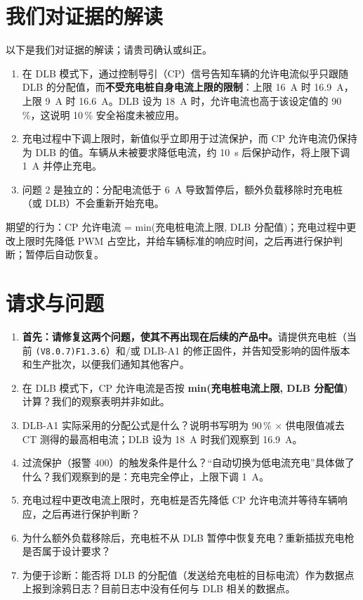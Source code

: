 \documentclass[11pt,a4paper]{article}
\begin{document}
\section{我们对证据的解读}

以下是我们对证据的解读；请贵司确认或纠正。

\begin{enumerate}
\item 在 DLB 模式下，通过控制导引（CP）信号告知车辆的允许电流似乎只跟随 DLB 的分配值，而\textbf{不受充电桩自身电流上限的限制}：上限 16~A 时 16.9~A，上限 9~A 时 16.6~A。DLB 设为 18~A 时，允许电流也高于该设定值的 90\,\%，这说明 10\,\% 安全裕度未被应用。
\item 充电过程中下调上限时，新值似乎立即用于过流保护，而 CP 允许电流仍保持为 DLB 的值。车辆从未被要求降低电流，约 10~s 后保护动作，将上限下调 1~A 并停止充电。
\item 问题 2 是独立的：分配电流低于 6~A 导致暂停后，额外负载移除时充电桩（或 DLB）不会重新开始充电。
\end{enumerate}

期望的行为：CP 允许电流 = min(充电桩电流上限, DLB 分配值)；充电过程中更改上限时先降低 PWM 占空比，并给车辆标准的响应时间，之后再进行保护判断；暂停后自动恢复。

\section{请求与问题}

\begin{enumerate}
\item \textbf{首先：请修复这两个问题，使其不再出现在后续的产品中。}请提供充电桩（当前 \texttt{(V8.0.7)F1.3.6}）和/或 DLB-A1 的修正固件，并告知受影响的固件版本和生产批次，以便我们通知其他客户。
\item 在 DLB 模式下，CP 允许电流是否按 \textbf{min(充电桩电流上限, DLB 分配值)} 计算？我们的观察表明并非如此。
\item DLB-A1 实际采用的分配公式是什么？说明书写明为 90\,\% × 供电限值减去 CT 测得的最高相电流；DLB 设为 18~A 时我们观察到 16.9~A。
\item 过流保护（报警 400）的触发条件是什么？“自动切换为低电流充电”具体做了什么？我们观察到的是：充电完全停止，上限下调 1~A。
\item 充电过程中更改电流上限时，充电桩是否先降低 CP 允许电流并等待车辆响应，之后再进行保护判断？
\item 为什么额外负载移除后，充电桩不从 DLB 暂停中恢复充电？重新插拔充电枪是否属于设计要求？
\item 为便于诊断：能否将 DLB 的分配值（发送给充电桩的目标电流）作为数据点上报到涂鸦日志？目前日志中没有任何与 DLB 相关的数据点。
\end{enumerate}
\end{document}
